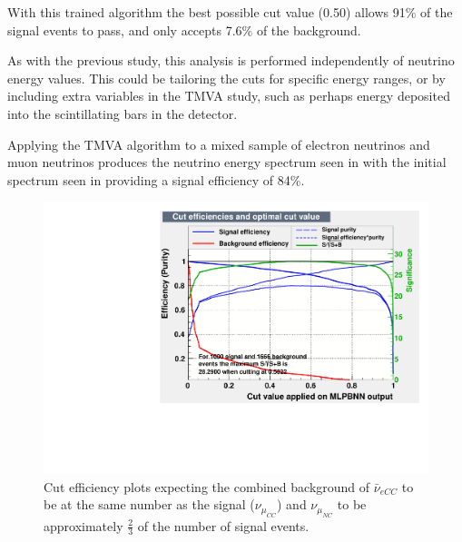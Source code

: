 With this trained algorithm the best possible cut value (0.50) allows 91\% of the signal events to pass, and only accepts 7.6\% of the background.

As with the previous study, this analysis is performed independently of neutrino energy values. This could be tailoring the cuts for specific energy ranges, or by including extra variables in the TMVA study, such as perhaps energy deposited into the scintillating bars in the detector.%

Applying the TMVA algorithm to a mixed sample of electron neutrinos and muon neutrinos produces the neutrino energy spectrum seen in  with the initial spectrum seen in  providing a signal efficiency of 84\%.


\begin{figure}[h!]
\centering

\includegraphics[width=\textwidth]{figures/newTMVAplots/CorrCutMLPBNN.pdf}
\caption{Cut efficiency plots expecting the combined background of $\bar{\nu}_{eCC}$ to be at the same number as the signal ($\nu_{\mu_{CC}}$) and $\nu_{\mu_{NC}}$ to be approximately $\frac{2}{3}$ of the number of signal events. }
\label{fig:TMVANeucuts}
\end{figure}

